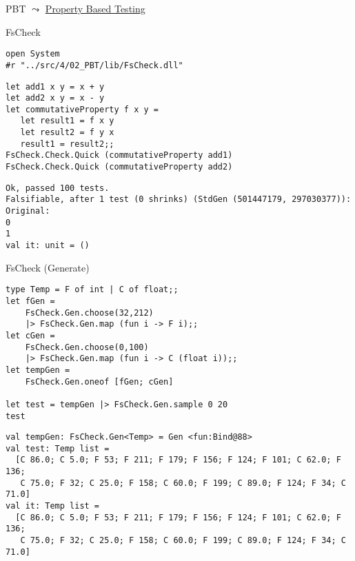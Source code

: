 \documentclass[t]{beamer}
\begin{document}
\begin{frame}[label={sec:org24d1c2f}]{PBT}
\(\leadsto\) \href{./4.2 An introduction to property based testing.pdf}{Property Based Testing}
\end{frame}

\begin{frame}[label={sec:orgb14df37},fragile]{FsCheck}
 \begin{verbatim}
open System
#r "../src/4/02_PBT/lib/FsCheck.dll"
\end{verbatim}

\begin{verbatim}
let add1 x y = x + y
let add2 x y = x - y
let commutativeProperty f x y =
   let result1 = f x y
   let result2 = f y x
   result1 = result2;;
FsCheck.Check.Quick (commutativeProperty add1)
FsCheck.Check.Quick (commutativeProperty add2)
\end{verbatim}

\begin{verbatim}
Ok, passed 100 tests.
Falsifiable, after 1 test (0 shrinks) (StdGen (501447179, 297030377)):
Original:
0
1
val it: unit = ()
\end{verbatim}
\end{frame}

\begin{frame}[label={sec:orgdea4c61},fragile]{FsCheck (Generate)}
 \begin{verbatim}
type Temp = F of int | C of float;;
let fGen =
    FsCheck.Gen.choose(32,212)
    |> FsCheck.Gen.map (fun i -> F i);;
let cGen =
    FsCheck.Gen.choose(0,100)
    |> FsCheck.Gen.map (fun i -> C (float i));;
let tempGen =
    FsCheck.Gen.oneof [fGen; cGen]

let test = tempGen |> FsCheck.Gen.sample 0 20
test
\end{verbatim}

\begin{verbatim}
val tempGen: FsCheck.Gen<Temp> = Gen <fun:Bind@88>
val test: Temp list =
  [C 86.0; C 5.0; F 53; F 211; F 179; F 156; F 124; F 101; C 62.0; F 136;
   C 75.0; F 32; C 25.0; F 158; C 60.0; F 199; C 89.0; F 124; F 34; C 71.0]
val it: Temp list =
  [C 86.0; C 5.0; F 53; F 211; F 179; F 156; F 124; F 101; C 62.0; F 136;
   C 75.0; F 32; C 25.0; F 158; C 60.0; F 199; C 89.0; F 124; F 34; C 71.0]
\end{verbatim}
\end{frame}
\end{document}
